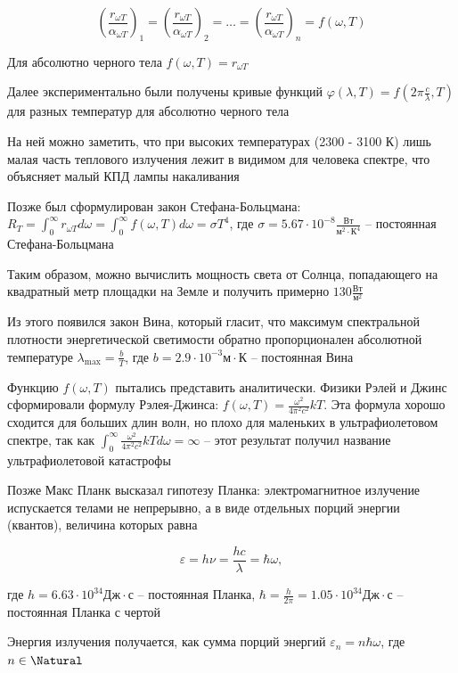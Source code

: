\documentclass[12pt]{article}
\begin{document}
\[\left(\frac{r_{\omega T}}{\alpha_{\omega T}}\right)_1 = \left(\frac{r_{\omega T}}{\alpha_{\omega T}}\right)_2 = \dots = \left(\frac{r_{\omega T}}{\alpha_{\omega T}}\right)_n = f(\omega, T)\]

Для абсолютно черного тела $f(\omega, T) = r_{\omega T}$

Далее экспериментально были получены кривые функций $\varphi(\lambda, T) = f\left(2\pi \frac{c}{\lambda}, T\right)$ для разных температур для абсолютно черного тела

На ней можно заметить, что при высоких температурах (2300 - 3100 К) лишь малая часть теплового излучения лежит в видимом для человека спектре, что объясняет малый КПД лампы накаливания


Позже был сформулирован закон Стефана-Больцмана: $R_T = \int_0^\infty r_{\omega T} d\omega = \int_0^\infty f(\omega, T) d\omega = \sigma T^4$, где $\sigma = 5.67 \cdot 10^{-8} \frac{\text{Вт}}{\text{м}^2 \cdot \text{К}^4}$ -- постоянная Стефана-Больцмана

Таким образом, можно вычислить мощность света от Солнца, попадающего на квадратный метр площадки на Земле и получить примерно $130 \frac{\text{Вт}}{\text{м}^2}$

Из этого появился закон Вина, который гласит, что максимум спектральной плотности энергетической светимости обратно пропорционален абсолютной температуре $\lambda_{\max} = \frac{b}{T}$, где $b = 2.9 \cdot 10^{-3} \text{м}\cdot\text{К}$ -- постоянная Вина

Функцию $f(\omega, T)$ пытались представить аналитически. Физики Рэлей и Джинс сформировали формулу Рэлея-Джинса: $f(\omega, T) = \frac{\omega^2}{4\pi^2 c^2} kT$. Эта формула хорошо сходится для больших длин волн, но плохо для маленьких в ультрафиолетовом спектре, так как $\int_0^\infty \frac{\omega^2}{4\pi^2 c^2} kT d\omega = \infty$ -- этот результат получил название ультрафиолетовой катастрофы

Позже Макс Планк высказал гипотезу Планка: электромагнитное излучение испускается телами не непрерывно, а в виде отдельных порций энергии (квантов), величина которых равна 

\[\varepsilon = h \nu = \frac{h c}{\lambda} = \hbar \omega,\]

где $h = 6.63 \cdot 10^{34} \text{Дж}\cdot\text{с}$ -- постоянная Планка, $\hbar = \frac{h}{2\pi} = 1.05 \cdot 10^{34} \text{Дж}\cdot\text{с}$ -- постоянная Планка с чертой

Энергия излучения получается, как сумма порций энергий $\varepsilon_n = n \hbar \omega$, где $n \in \Natural$
\end{document}
